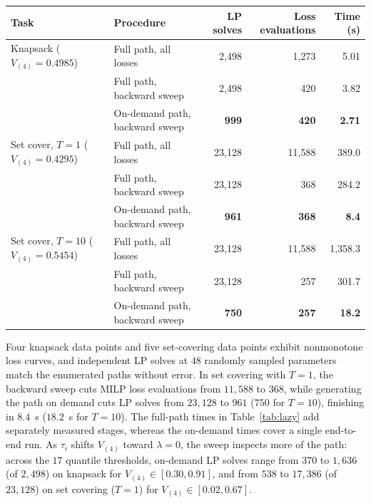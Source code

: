 \documentclass[a4paper,10pt]{article}
\theoremstyle{plain}
\theoremstyle{remark}
\begin{document}
\vspace{4pt}
\noindent\begin{minipage}{\linewidth}
\centering\small
{}
\label{tab:lazy}
\vspace{2pt}
\setlength{\tabcolsep}{5pt}
\begin{tabular}{@{}llrrr@{}}
\toprule
Task & Procedure & LP solves & Loss evaluations & Time (s)\\
\midrule
Knapsack ($V_{(4)}=0.4985$) & Full path, all losses & 2,498 & 1,273 & 5.01 \\
& Full path, backward sweep & 2,498 & 420 & 3.82 \\
& On-demand path, backward sweep & \textbf{999} & \textbf{420} & \textbf{2.71} \\
\addlinespace[3pt]
Set cover, $T=1$ ($V_{(4)}=0.4295$) & Full path, all losses & 23,128 & 11,588 & 389.0 \\
& Full path, backward sweep & 23,128 & 368 & 284.2 \\
& On-demand path, backward sweep & \textbf{961} & \textbf{368} & \textbf{8.4} \\
\addlinespace[3pt]
Set cover, $T=10$ ($V_{(4)}=0.5454$) & Full path, all losses & 23,128 & 11,588 & 1,358.3 \\
& Full path, backward sweep & 23,128 & 257 & 301.7 \\
& On-demand path, backward sweep & \textbf{750} & \textbf{257} & \textbf{18.2} \\
\bottomrule
\end{tabular}
\end{minipage}
\vspace{4pt}

Four knapsack data points and five set-covering data points exhibit nonmonotone loss curves, and independent LP solves at $48$ randomly sampled parameters match the enumerated paths without error. In set covering with $T=1$, the backward sweep cuts MILP loss evaluations from $11{,}588$ to $368$, while generating the path on demand cuts LP solves from $23{,}128$ to $961$ ($750$ for $T=10$), finishing in $8.4$~s ($18.2$~s for $T=10$). The full-path times in Table~\ref{tab:lazy} add separately measured stages, whereas the on-demand times cover a single end-to-end run. As $\tau_i$ shifts $V_{(4)}$ toward $\lambda=0$, the sweep inspects more of the path: across the $17$ quantile thresholds, on-demand LP solves range from $370$ to $1{,}636$ (of $2{,}498$) on knapsack for $V_{(4)}\in[0.30,0.91]$, and from $538$ to $17{,}386$ (of $23{,}128$) on set covering ($T=1$) for $V_{(4)}\in[0.02,0.67]$.
\end{document}
